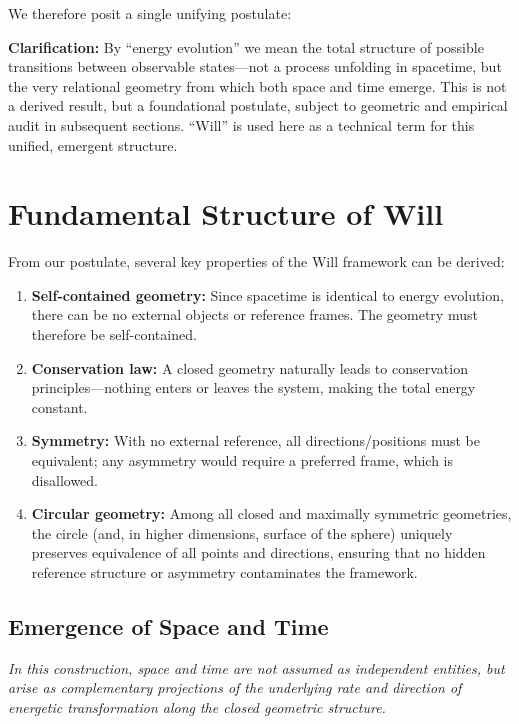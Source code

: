 \documentclass{article}
\begin{document}
\vspace{1em}
We therefore posit a single unifying postulate:

\begin{center}
\end{center}

\textbf{Clarification:} By ``energy evolution'' we mean the total structure of possible transitions between observable states---not a process unfolding in spacetime, but the very relational geometry from which both space and time emerge. This is not a derived result, but a foundational postulate, subject to geometric and empirical audit in subsequent sections. ``Will'' is used here as a technical term for this unified, emergent structure.


\section{Fundamental Structure of Will}

From our postulate, several key properties of the Will framework can be derived:

\begin{enumerate}
    \item \textbf{Self-contained geometry:} Since spacetime is identical to energy evolution, there can be no external objects or reference frames. The geometry must therefore be self-contained.
    
    \item \textbf{Conservation law:} A closed geometry naturally leads to conservation principles—nothing enters or leaves the system, making the total energy constant.
    
    \item \textbf{Symmetry:} With no external reference, all directions/positions must be equivalent; any asymmetry would require a preferred frame, which is disallowed. 
    
    \item \textbf{Circular geometry:} Among all closed and maximally symmetric geometries, the circle (and, in higher dimensions, surface of the sphere) uniquely preserves equivalence of all points and directions, ensuring that no hidden reference structure or asymmetry contaminates the framework.
\end{enumerate}

\subsection{Emergence of Space and Time}
\textit{In this construction, space and time are not assumed as independent entities, but arise as complementary projections of the underlying rate and direction of energetic transformation along the closed geometric structure.}
\end{document}
